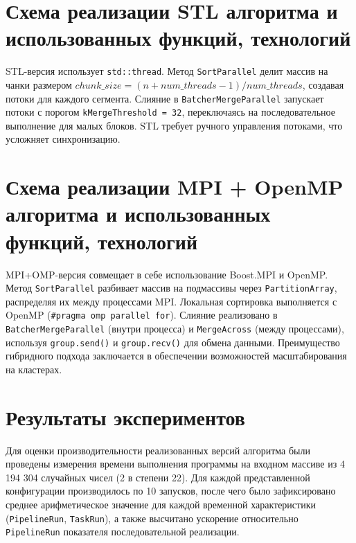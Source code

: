 \documentclass[a4paper,12pt]{article}
\begin{document}
\section*{Схема реализации STL алгоритма и использованных функций, технологий}
STL-версия использует \texttt{std::thread}. Метод \texttt{SortParallel} делит массив на чанки размером \(chunk\_size = (n + num\_threads - 1) / num\_threads\), создавая потоки для каждого сегмента. Слияние в \texttt{BatcherMergeParallel} запускает потоки с порогом \texttt{kMergeThreshold = 32}, переключаясь на последовательное выполнение для малых блоков. 
STL требует ручного управления потоками, что усложняет синхронизацию.


\section*{Схема реализации MPI + OpenMP алгоритма и использованных функций, технологий}
MPI+OMP-версия совмещает в себе использование Boost.MPI и OpenMP. Метод \texttt{SortParallel} разбивает массив на подмассивы через \texttt{PartitionArray}, распределяя их между процессами MPI. Локальная сортировка выполняется с OpenMP (\texttt{\#pragma omp parallel for}). Слияние реализовано в \texttt{BatcherMergeParallel} (внутри процесса) и \texttt{MergeAcross} (между процессами), используя \texttt{group.send()} и \texttt{group.recv()} для обмена данными. 
Преимущество гибридного подхода заключается в обеспечении возможностей масштабирования на кластерах.


\section*{Результаты экспериментов}
Для оценки производительности реализованных версий алгоритма были проведены измерения времени выполнения программы на входном массиве из 4 194 304 случайных чисел (2 в степени 22). 
Для каждой представленной конфигурации производилось по 10 запусков, после чего было зафиксировано среднее арифметическое значение для каждой временной характеристики (\texttt{PipelineRun}, \texttt{TaskRun}), а также высчитано ускорение относительно \texttt{PipelineRun} показателя последовательной реализации.
\end{document}
